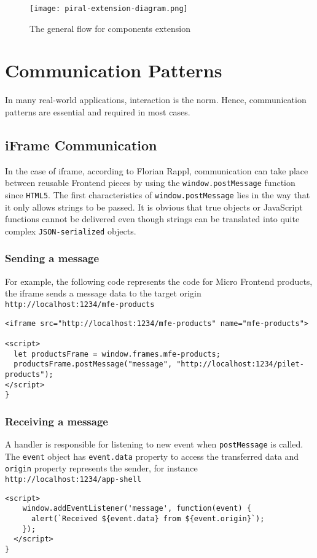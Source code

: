 \documentclass[a4paper]{book}
\begin{document}
\begin{figure}[h!]
  \centering
  \captionsetup{justification=centering}
  \texttt{[image: piral-extension-diagram.png]}
  \caption{The general flow for components extension \cite{Rap20}}
  \label{fig:extension-diagram}
\end{figure}

\section{Communication Patterns}
In many real-world applications, interaction is the norm. Hence, communication patterns are essential and required in most cases.
\subsection{iFrame Communication}

In the case of iframe, according to Florian Rappl, communication can take place between reusable Frontend pieces by using the \verb|window.postMessage| function since \verb|HTML5|. The first characteristics of \verb|window.postMessage| lies in the way that it only allows strings to be passed. It is obvious that true objects or JavaScript functions cannot be delivered even though strings can be translated into quite complex \verb|JSON-serialized| objects. \cite{Rap20}
\subsubsection{Sending a message}
For example, the following code represents the code for Micro Frontend products, the iframe sends a message data to the target origin \verb|http://localhost:1234/mfe-products|
\begin{lstlisting}[caption={Iframe script of Micro Frontend products}]
<iframe src="http://localhost:1234/mfe-products" name="mfe-products">

<script>
  let productsFrame = window.frames.mfe-products;
  productsFrame.postMessage("message", "http://localhost:1234/pilet-products");
</script>
}
\end{lstlisting}
\subsubsection{Receiving a message}
A handler is responsible for listening to new event when \verb|postMessage| is called. The \verb|event| object has \verb|event.data| property to access the transferred data and \verb|origin| property represents the sender, for instance \verb|http://localhost:1234/app-shell|
\begin{lstlisting}[caption={An iframe script can be properly set up for receiving the message in other iframes}]
  <script>
    window.addEventListener('message', function(event) {
      alert(`Received ${event.data} from ${event.origin}`);
    });
  </script>
}
\end{lstlisting}
\end{document}
